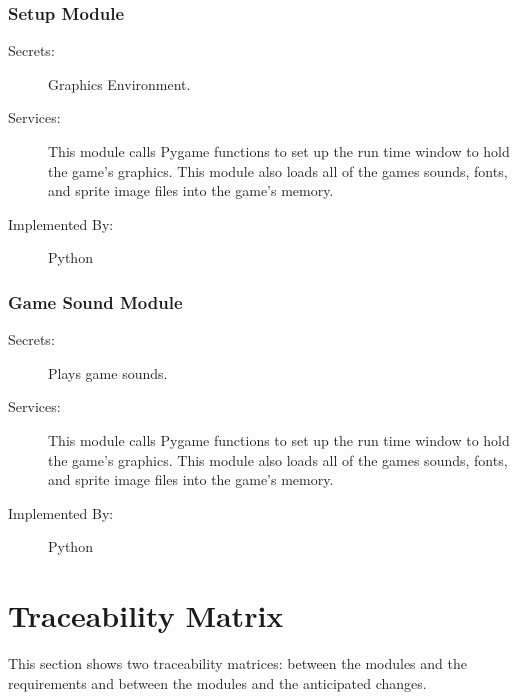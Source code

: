 \documentclass[12pt, titlepage]{article}
\begin{document}
\subsubsection{Setup Module}
\begin{description}
\item[Secrets:]Graphics Environment.
\item[Services:] This module calls Pygame functions to set up the run time window to hold the game's graphics.
    This module also loads all of the games sounds, fonts, and sprite image files into the game's memory.
\item[Implemented By:] Python
\end{description}

\subsubsection{Game Sound Module}
\begin{description}
\item[Secrets:]Plays game sounds.
\item[Services:] This module calls Pygame functions to set up the run time window to hold the game's graphics.
    This module also loads all of the games sounds, fonts, and sprite image files into the game's memory.
\item[Implemented By:] Python
\end{description}

\newpage
\section{Traceability Matrix} \label{SecTM}

This section shows two traceability matrices: between the modules and the
requirements and between the modules and the anticipated changes.
\end{document}
